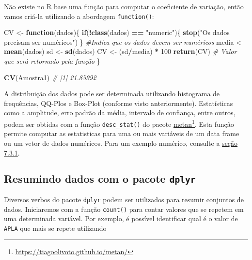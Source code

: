 \documentclass[
]{book}
\newenvironment{Shaded}{\begin{snugshade}}{\end{snugshade}}
\newcommand{\CommentTok}[1]{\textcolor[rgb]{0.56,0.35,0.01}{\textit{#1}}}
\newcommand{\ControlFlowTok}[1]{\textcolor[rgb]{0.13,0.29,0.53}{\textbf{#1}}}
\newcommand{\DecValTok}[1]{\textcolor[rgb]{0.00,0.00,0.81}{#1}}
\newcommand{\KeywordTok}[1]{\textcolor[rgb]{0.13,0.29,0.53}{\textbf{#1}}}
\newcommand{\NormalTok}[1]{#1}
\newcommand{\OperatorTok}[1]{\textcolor[rgb]{0.81,0.36,0.00}{\textbf{#1}}}
\newcommand{\StringTok}[1]{\textcolor[rgb]{0.31,0.60,0.02}{#1}}
\begin{document}
Não existe no R base uma função para computar o coeficiente de variação, então vamos criá-la utilizando a abordagem \texttt{function()}:  

\begin{Shaded}
\begin{Highlighting}[]
\NormalTok{CV <-}\StringTok{ }\ControlFlowTok{function}\NormalTok{(dados)\{}
  \ControlFlowTok{if}\NormalTok{(}\OperatorTok{!}\KeywordTok{class}\NormalTok{(dados) }\OperatorTok{==}\StringTok{ "numeric"}\NormalTok{)\{}
    \KeywordTok{stop}\NormalTok{(}\StringTok{"Os dados precisam ser numéricos"}\NormalTok{)}
\NormalTok{    \} }\CommentTok{#Indica que os dados devem ser numéricos}
\NormalTok{  media <-}\StringTok{ }\KeywordTok{mean}\NormalTok{(dados)}
\NormalTok{  sd <-}\StringTok{ }\KeywordTok{sd}\NormalTok{(dados)}
\NormalTok{  CV <-}\StringTok{ }\NormalTok{(sd}\OperatorTok{/}\NormalTok{media) }\OperatorTok{*}\StringTok{ }\DecValTok{100}
  \KeywordTok{return}\NormalTok{(CV) }\CommentTok{# Valor que será retornado pela função}
\NormalTok{\}}

\KeywordTok{CV}\NormalTok{(Amostra1)}
\CommentTok{# [1] 21.85992}
\end{Highlighting}
\end{Shaded}

A distribuição dos dados pode ser determinada utilizando histograma de frequências, QQ-Plos e Box-Plot (conforme visto anteriormente). Estatísticas como a amplitude, erro padrão da média, intervalo de confiança, entre outros, podem ser obtidas com a função \texttt{desc\_stat()}  do pacote \href{https://tiagoolivoto.github.io/metan/}{metan}\footnote{\url{https://tiagoolivoto.github.io/metan/}}. Esta função permite computar as estatisticas para uma ou mais variáveis de um data frame ou um vetor de dados numéricos. Para um exemplo numérico, consulte a \protect\hyperlink{dstat}{seção 7.3.1}.

\hypertarget{resumindo-dados-com-o-pacote-dplyr}{%
\subsection{\texorpdfstring{Resumindo dados com o pacote \texttt{dplyr}}{Resumindo dados com o pacote dplyr}}\label{resumindo-dados-com-o-pacote-dplyr}}

Diversos verbos do pacote \texttt{dplyr} podem ser utilizados para resumir conjuntos de dados. Iniciaremos
com a função \texttt{count()} para contar valores que se repetem em uma determinada variável. Por exemplo, é possível identificar qual é o valor de \texttt{APLA} que mais se repete utilizando
\end{document}
